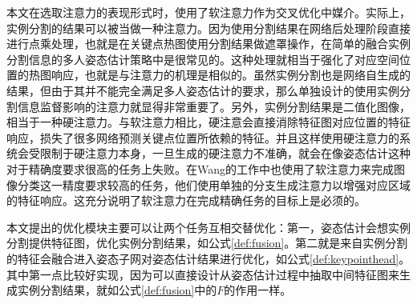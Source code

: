 本文在选取注意力的表现形式时，使用了软注意力作为交叉优化中媒介。实际上，实例分割的结果可以被当做一种注意力。因为使用分割结果在网络后处理阶段直接进行点乘处理，也就是在关键点热图使用分割结果做遮罩操作，在简单的融合实例分割信息的多人姿态估计策略中是很常见的。这种处理就相当于强化了对应空间位置的热图响应，也就是与注意力的机理是相似的。虽然实例分割也是网络自生成的结果，但由于其并不能完全满足多人姿态估计的要求，那么单独设计的使用实例分割信息监督影响的注意力就显得非常重要了。另外，实例分割结果是二值化图像，相当于一种硬注意力。与软注意力相比，硬注意会直接消除特征图对应位置的特征响应，损失了很多网络预测关键点位置所依赖的特征。并且这样使用硬注意力的系统会受限制于硬注意力本身，一旦生成的硬注意力不准确，就会在像姿态估计这种对于精确度要求很高的任务上失败。在Wang的工作\cite{wang2017residual}中也使用了软注意力来完成图像分类这一精度要求较高的任务，他们使用单独的分支生成注意力以增强对应区域的特征响应。这充分说明了软注意力在完成精确任务的目标上是必须的。

本文提出的优化模块主要可以让两个任务互相交替优化：第一，姿态估计会想实例分割提供特征图，优化实例分割结果，如公式\eqref{def:fusion}。第二就是来自实例分割的特征会融合进入姿态子网对姿态估计结果进行优化，如公式\eqref{def:keypointhead}。其中第一点比较好实现，因为可以直接设计从姿态估计过程中抽取中间特征图来生成实例分割结果，就如公式\eqref{def:fusion}中的$F$的作用一样。

